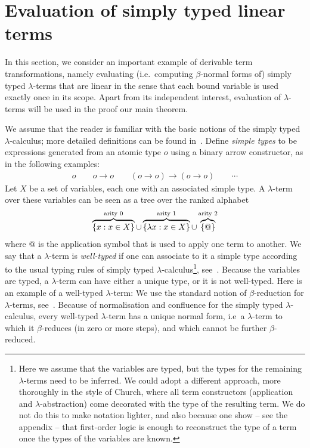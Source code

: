 \section{Evaluation of simply typed linear terms}
\label{sec:one-register}

In this section, we consider an important example of derivable term transformations, namely evaluating (i.e.~computing $\beta$-normal forms of)  simply typed  $\lambda$-terms that are linear in the sense that each bound variable is used exactly once in its scope. Apart from its independent interest, evaluation of $\lambda$-terms will  be used in the proof our main theorem. 



\newcommand{\otype}{o}
We assume that the reader is familiar with the basic notions of the simply typed $\lambda$-calculus; more detailed definitions can be found in~\cite{sorensen_lectures_2006}. Define  \emph{simple types} to be expressions  generated from an atomic type $\otype$ using a binary arrow constructor, as in the following examples:
    \begin{align*}
        \otype \qquad \otype \to \otype \qquad (\otype \to \otype) \to (\otype \to \otype) \qquad \cdots 
    \end{align*}
Let $X$ be a set of variables, each one with an associated simple type.  A $\lambda$-term over these variables can be seen as a tree over the ranked alphabet
\begin{align*}
      \overbrace{\{x : x \in X\}}^{\text{arity 0}} \cup \overbrace{\{\lambda x : x \in X\}}^{\text{arity 1}} \cup  \overbrace{\{@\}}^{\text{arity 2}}
\end{align*}
where @ is the application symbol that is used to apply one term to another.
We say that a $\lambda$-term is \emph{well-typed} if one can associate  to it  a simple type according to the usual typing rules of simply typed $\lambda$-calculus\footnote{
    Here we assume that the variables are typed, but the types for the remaining $\lambda$-terms need to be inferred. We could adopt a different approach, more thoroughly in the style of Church, where all term constructors (application and $\lambda$-abstraction) come decorated with the type of the resulting term. We do not do this to make  notation lighter, and also because one show -- see the appendix -- that first-order logic is enough to reconstruct the type of a term once the types of the variables are known. 
}, see~\cite[Definition 3.2.1]{sorensen_lectures_2006}. Because the variables are typed, a  $\lambda$-term can have either a unique type, or it is not well-typed.  Here is an example of a well-typed $\lambda$-term: 
We use the standard notion of $\beta$-reduction for $\lambda$-terms, see~\cite[Definition 1.2.1]{sorensen_lectures_2006}. 
Because of normalisation and confluence for the simply typed $\lambda$-calculus, every well-typed $\lambda$-term has a unique normal form, i.e~a $\lambda$-term to which it $\beta$-reduces (in zero or more steps), and which cannot be further $\beta$-reduced.


